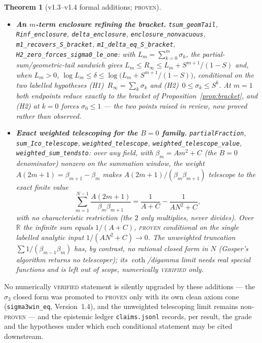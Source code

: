 \documentclass[11pt]{article}
\newtheorem{theorem}{Theorem}
\newcommand{\R}{\mathbb{R}}
\newcommand{\Rinf}{R_\infty}
\begin{document}
\begin{theorem}[v1.3--v1.4 formal additions; \textsc{proven}]
\begin{itemize}
\item[\textnormal{(C)}] \textbf{An $m$-term enclosure refining the bracket.}
\texttt{tsum\_geomTail}, \texttt{Rinf\_enclosure}, \texttt{delta\_enclosure},
\texttt{enclosure\_nonvacuous}, \texttt{m1\_recovers\_S\_bracket},
\texttt{m1\_delta\_eq\_S\_bracket}, \texttt{H2\_zero\_forces\_sigma0\_le\_one}:
with $L_m=\sum_{k=0}^m\sigma_k$, the partial-sum/geometric-tail sandwich gives
$L_m\le\Rinf\le L_m+S^{m+1}/(1-S)$ and, when $L_m>0$,
$\log L_m\le\delta\le\log\!\bigl(L_m+S^{m+1}/(1-S)\bigr)$, \emph{conditional} on the
two labelled hypotheses \textnormal{(H1)}~$\Rinf=\sum_k\sigma_k$ and
\textnormal{(H2)}~$0\le\sigma_k\le S^k$. At $m=1$ both endpoints reduce
\emph{exactly} to the bracket of Proposition~\ref{prop:bracket}, and
\textnormal{(H2)} at $k=0$ forces $\sigma_0\le1$ --- the two points raised in review,
now proved rather than observed.

\item[\textnormal{(D)}] \textbf{Exact weighted telescoping for the $B=0$ family.}
\texttt{partialFraction}, \texttt{sum\_Ico\_telescope}, \texttt{weighted\_telescope},
\texttt{weighted\_telescope\_value}, \texttt{weighted\_sum\_tendsto}: over any field,
with $\beta_m=Am^2+C$ (the $B=0$ denominator) nonzero on the summation window, the
weight $A(2m+1)=\beta_{m+1}-\beta_m$ makes $A(2m+1)/(\beta_m\beta_{m+1})$ telescope to
the exact finite value
\[
  \sum_{m=1}^{N-1}\frac{A(2m+1)}{\beta_m\beta_{m+1}}=\frac1{A+C}-\frac1{AN^2+C},
\]
with no characteristic restriction (the $2$ only multiplies, never divides). Over
$\R$ the infinite sum equals $1/(A+C)$, \textsc{proven} \emph{conditional} on the
single labelled analytic input $1/(AN^2+C)\to0$. The \emph{unweighted} truncation
$\sum1/(\beta_{m-1}\beta_m)$ has, by contrast, no rational closed form in $N$
(Gosper's algorithm returns no telescoper); its $\coth$/digamma limit needs real
special functions and is left out of scope, numerically \textsc{verified} only.
\end{itemize}
\end{theorem}

\noindent No numerically \textsc{verified} statement is silently upgraded by these
additions --- the $\sigma_3$ closed form was promoted to \textsc{proven} only with its
own clean axiom cone (\texttt{sigma3win\_eq}, Version~1.4), and the unweighted
telescoping limit remains non-\textsc{proven} --- and the epistemic ledger
\texttt{claims.jsonl} records, per result, the grade and the hypotheses under which
each conditional statement may be cited downstream.
\end{document}

